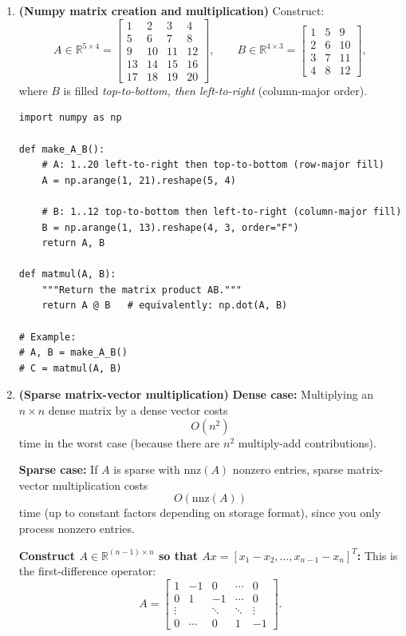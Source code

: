 \documentclass[en,hazy,blue,12pt,normal]{elegantnote}
\begin{document}
\begin{enumerate}[label=\textbf{(\alph*)}, leftmargin=2.2em]

\item \textbf{(Numpy matrix creation and multiplication)}
Construct:
\[
A\in\mathbb{R}^{5\times 4}=\begin{bmatrix}
1&2&3&4\\
5&6&7&8\\
9&10&11&12\\
13&14&15&16\\
17&18&19&20
\end{bmatrix},
\qquad
B\in\mathbb{R}^{4\times 3}=\begin{bmatrix}
1&5&9\\
2&6&10\\
3&7&11\\
4&8&12
\end{bmatrix},
\]
where $B$ is filled \emph{top-to-bottom, then left-to-right} (column-major order).

\begin{lstlisting}[style=py]
import numpy as np

def make_A_B():
    # A: 1..20 left-to-right then top-to-bottom (row-major fill)
    A = np.arange(1, 21).reshape(5, 4)

    # B: 1..12 top-to-bottom then left-to-right (column-major fill)
    B = np.arange(1, 13).reshape(4, 3, order="F")
    return A, B

def matmul(A, B):
    """Return the matrix product AB."""
    return A @ B   # equivalently: np.dot(A, B)

# Example:
# A, B = make_A_B()
# C = matmul(A, B)
\end{lstlisting}

\item \textbf{(Sparse matrix-vector multiplication)}
\textbf{Dense case:} Multiplying an $n\times n$ dense matrix by a dense vector costs
\[
O(n^2)
\]
time in the worst case (because there are $n^2$ multiply-add contributions).

\medskip
\noindent \textbf{Sparse case:} If $A$ is sparse with $\mathrm{nnz}(A)$ nonzero entries, sparse matrix-vector multiplication costs
\[
O(\mathrm{nnz}(A))
\]
time (up to constant factors depending on storage format), since you only process nonzero entries.

\medskip
\noindent \textbf{Construct $A\in\mathbb{R}^{(n-1)\times n}$ so that $Ax=[x_1-x_2,\dots,x_{n-1}-x_n]^T$:}
This is the first-difference operator:
\[
A=\begin{bmatrix}
1 & -1 & 0 & \cdots & 0\\
0 & 1 & -1 & \cdots & 0\\
\vdots & & \ddots & \ddots & \vdots\\
0 & \cdots & 0 & 1 & -1
\end{bmatrix}.
\]


\end{enumerate}
\end{document}

